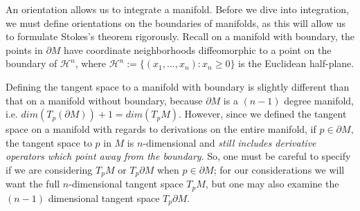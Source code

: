 An orientation allows us to integrate a manifold. Before we dive into integration, we must define orientations on the 
boundaries of manifolds, as this will allow us to formulate Stokes's theorem rigorously. Recall on a manifold with 
boundary, the points in $\partial M$ have coordinate neighborhoods diffeomorphic to a point on the boundary of 
$\mathcal H^n$, where $\mathcal H^n := \{(x_1, ..., x_n) : x_n\geq 0\}$ is the Euclidean half-plane. 

Defining the tangent space to a manifold with boundary is slightly different than that on a manifold without boundary, 
because $\partial M$ is a $(n - 1)$ degree manifold, i.e. $dim(T_p(\partial M)) + 1 = dim(T_p M)$. However, since we defined 
the tangent space on a manifold with regards to derivations on the entire manifold, if $p\in \partial M$, the tangent space 
to $p$ in $M$ is $n$-dimensional and \textit{still includes derivative operators which point away from the boundary}. 
So, one must be careful to specify if we are considering $T_p M$ or $T_p\partial M$ when $p\in\partial M$; for our 
considerations we will want the full $n$-dimensional tangent space $T_p M$, but one may also examine the $(n - 1)$ 
dimensional tangent space $T_p\partial M$. 

